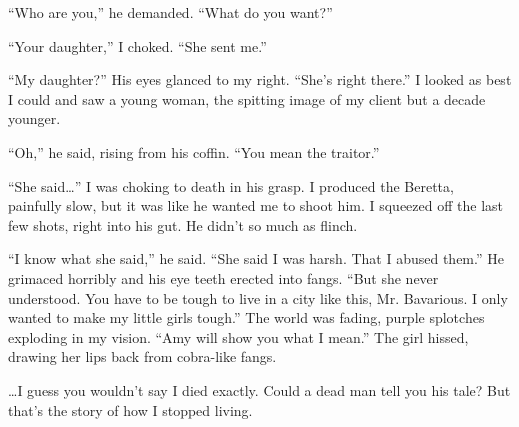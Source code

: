 ``Who are you,'' he demanded. ``What do you
want?''



``Your daughter,'' I choked. ``She sent
me.''



``My daughter?'' His eyes glanced to my right.
``She's right there.'' I looked as best I could and
saw a young woman, the spitting image of my client but a decade
younger.



``Oh,'' he said, rising from his coffin. ``You mean
the traitor.''



``She said{\ldots}'' I was choking to death in his grasp.
I produced the Beretta, painfully slow, but it was like he wanted
me to shoot him. I squeezed off the last few shots, right into his
gut. He didn't so much as flinch.



``I know what she said,'' he said. ``She said I was
harsh. That I abused them.'' He grimaced horribly and his eye
teeth erected into fangs. ``But she never understood. You have
to be tough to live in a city like this, Mr. Bavarious. I only
wanted to make my little girls tough.'' The world was fading,
purple splotches exploding in my vision. ``Amy will show you
what I mean.'' The girl hissed, drawing her lips back from
cobra-like fangs.



{\ldots}I guess you wouldn't say I died exactly. Could a dead
man tell you his tale? But that's the story of how I stopped
living. 
 



